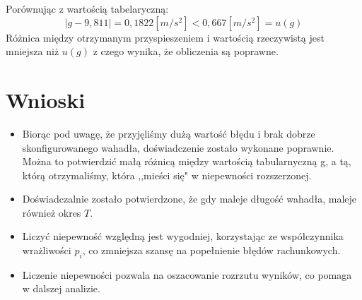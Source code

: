 \documentclass[18pt, twoside]{article}
\begin{document}
	Porównując z wartością tabelaryczną:
		\[|g-9,811|=0,1822 [{m}/{s^2}]< 0,667 [{m}/{s^2}] =u(g)\]
	Różnica między otrzymanym przyspieszeniem i wartością rzeczywistą jest mniejsza niż \(u(g)\) z czego wynika, że obliczenia są poprawne. 
	
	\section{Wnioski}
	\begin{itemize}
			
		\item Biorąc pod uwagę, że przyjęliśmy dużą wartość błędu i brak dobrze skonfigurowanego wahadła, doświadczenie zostało wykonane poprawnie. Można to potwierdzić małą różnicą między wartością tabularnyczną g, a tą, którą otrzymaliśmy, która ,,mieści się" w niepewności rozszerzonej.
		\item Doświadczalnie zostało potwierdzone, że gdy maleje długość wahadła, maleje również okres \(T\). 
		\item Liczyć niepewność względną jest wygodniej, korzystając ze współczynnika wrażliwości \(p_i\), co zmniejsza szansę na popełnienie błędów rachunkowych.
		\item Liczenie niepewności pozwala na oszacowanie rozrzutu wyników, co pomaga w dalszej analizie.
	\end{itemize}
	
\end{document}
